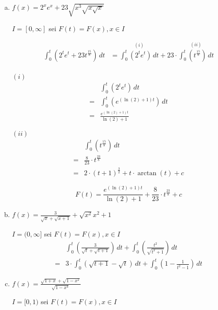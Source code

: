 \documentclass{article}
\begin{document}
\begin{enumerate}[a)]
\item $f(x) = 2^xe^x + 23 \sqrt{x^3\sqrt{x\sqrt{x}}}$

  $I = [0, \infty]$ sei $F(t) = F(x), x \in I$

  \begin{align*}
    \int_0^t \left( 2^te^t + 23 t^{\frac{15}{8}} \right)\,dt &=
    \overset{(i)}{\int_0^t \left( 2^te^t \right) \,dt} + 23 \cdot \overset{(ii)}{\int_0^t \left(t^{\frac{15}{8}} \right) \,dt} \\
  \end{align*}
  \begin{minipage}[t]{.45\textwidth}
    \textbf{$(i)$}
    \begin{align*}
      &\int_0^t \left( 2^te^t \right) \,dt \\
      = & \int_0^t \left( e^{(\ln(2) + 1)t} \right) \,dt \\
      = & \frac{e^{(\ln(2) + 1)t}}{\ln(2) + 1}
    \end{align*}
  \end{minipage}
  \hfill
  \begin{minipage}[t]{.45\textwidth}
    \textbf{$(ii)$}
    \begin{align*}
      &\int_0^t \left( t^{\frac{15}{8}} \right) \,dt \\
      = & \frac{8}{23} \cdot t^{\frac{23}{8}} \\
      = & 2 \cdot (t + 1)^{\frac{3}{2}} + t \cdot \arctan (t) + c
    \end{align*}
  \end{minipage}
  \[
    F(t) = \frac{e^{(\ln(2) + 1)t}}{\ln(2) + 1} + \frac{8}{23} \cdot t^{\frac{23}{8}} + c
  \]

\item $f(x) = \frac{3}{\sqrt{x} + \sqrt{x + 1}} + \sqrt{x^2}{x^2 + 1}$

  $I = (0, \infty]$ sei $F(t) = F(x), x \in I$
  \begin{align*}
    &\int_0^t \left( \frac{3}{\sqrt{t} + \sqrt{t + 1}} \right)\,dt + \int_0^t \left( \frac{t^2}{\sqrt{t^2 + 1}} \right)\,dt \\
    = &3 \cdot \int_0^t \left( \sqrt{t + 1} - \sqrt{t} \right)\,dt + \int_0^t \left( 1 - \frac{1}{t^2 - 1} \right)\,dt
  \end{align*}
\item $f(x) = \frac{\sqrt{1 + x} + \sqrt{1 - x^2}}{\sqrt{1 - x^4}}$

  $I = [0, 1)$ sei $F(t) = F(x), x \in I$


\end{enumerate}
\end{document}
